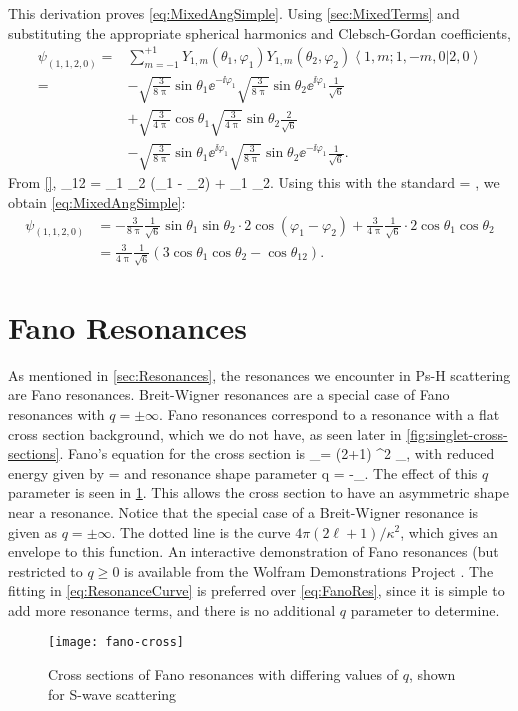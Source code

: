 \documentclass[Dissertation.tex]{subfiles}
\begin{document}
This derivation proves \cref{eq:MixedAngSimple}. Using \cref{sec:MixedTerms} and substituting the appropriate spherical harmonics and Clebsch-Gordan coefficients,
\begin{align}
\psi_{(1,1,2,0)} = &\sum_{m=-1}^{+1} Y_{1,m}(\theta_1,\varphi_1) Y_{1,m}(\theta_2,\varphi_2) \left< 1,m; 1,-m,0 | 2,0 \right> \nonumber \\
	= &-\sqrt{\frac{3}{8\uppi}} \sin\theta_1 \ee^{-\ii \varphi_1} \sqrt{\frac{3}{8\uppi}} \sin\theta_2 \ee^{\ii \varphi_1} \frac{1}{\sqrt{6}} \nonumber \\
	& + \sqrt{\frac{3}{4\uppi}} \cos\theta_1 \sqrt{\frac{3}{4\uppi}} \sin\theta_2 \frac{2}{\sqrt{6}} \nonumber \\
	& -\sqrt{\frac{3}{8\uppi}} \sin\theta_1 \ee^{\ii \varphi_1} \sqrt{\frac{3}{8\uppi}} \sin\theta_2 \ee^{-\ii \varphi_1} \frac{1}{\sqrt{6}}.
\end{align}
From \cref{},
\beq
\cos\theta_{12} = \sin\theta_1 \sin\theta_2 \cos(\varphi_1 - \varphi_2) + \cos\theta_1 \cos\theta_2.
\eeq
Using this with the standard
\beq
\cos\theta = ,
\eeq
we obtain \cref{eq:MixedAngSimple}:
\begin{align}
\psi_{(1,1,2,0)} &= -\frac{3}{8\uppi} \frac{1}{\sqrt{6}} \sin\theta_1 \sin\theta_2 \cdot 2 \cos(\varphi_1 - \varphi_2) + \frac{3}{4\uppi} \frac{1}{\sqrt{6}} \cdot 2 \cos\theta_1 \cos\theta_2 \nonumber \\
&= \frac{3}{4\uppi} \frac{1}{\sqrt{6}} \left(3 \cos\theta_1 \cos\theta_2 - \cos\theta_{12} \right).
\end{align}


\section{Fano Resonances}
\label{sec:FanoResonances}
As mentioned in \cref{sec:Resonances}, the resonances we encounter in Ps-H
scattering are Fano resonances. Breit-Wigner resonances are a special case of Fano
resonances with $q = \pm\infty$.
Fano resonances correspond to a resonance with a flat cross section 
background, which we do not have, as seen later in \cref{fig:singlet-cross-sections}.
Fano's equation for the cross section is \cite[p.596]{Bransden2003}
\beq
\label{eq:FanoRes}
\sigma_\ell =  (2\ell+1) \sin^2 \xi_\ell {},
\eeq
with reduced energy given by
\beq
\epsilon = 
\eeq
and resonance shape parameter
\beq
q = -\cot \xi_\ell.
\eeq
The effect of this $q$ parameter is seen in \cref{fig:FanoCross}. This allows 
the cross section to have an asymmetric shape near a resonance. Notice that 
the special case of a Breit-Wigner resonance is given as $q = \pm\infty$. The 
dotted line is the curve $4 \pi (2\ell+1) / \kappa^2$, which gives an 
envelope to this function. An interactive demonstration of Fano resonances
(but restricted to $q \geq 0$ is available from the Wolfram Demonstrations
Project \cite{FanoDemo}. The fitting in \cref{eq:ResonanceCurve} is preferred
over \cref{eq:FanoRes}, since it is simple to add more resonance terms,
and there is no additional $q$ parameter to determine.

\begin{figure}[H]
	\centering
	\texttt{[image: fano-cross]}
	\caption[Cross sections of Fano resonances]{Cross sections of Fano 
resonances with differing values of $q$, shown for S-wave scattering}
	\label{fig:FanoCross}
\end{figure}



\biblio
\end{document}
